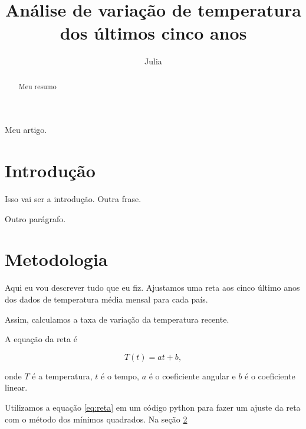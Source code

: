 \documentclass{article}
\begin{document}
\title{Análise de variação de temperatura dos últimos cinco anos}
\author{Julia}

\maketitle 

\begin{abstract}
Meu resumo 
\end{abstract}
	Meu artigo. 
	
\section{Introdução}
Isso vai ser a introdução.
Outra frase.

Outro parágrafo. 	

\section{Metodologia}
\label{sec:metodos}

Aqui eu vou descrever tudo que eu fiz. Ajustamos uma reta aos cinco último anos dos dados 
de temperatura média mensal para cada país. 

Assim, calculamos a taxa de variação da temperatura recente. 


A equação da reta é 

\begin{equation}
T(t) = a t + b, 
\label{eq:reta}
\end{equation}

\noindent
onde $T$ é a temperatura, $t$ é o tempo, $a$ é o coeficiente angular e $b$ é o coeficiente linear. 

Utilizamos a equação \ref{eq:reta} em um código python para fazer um ajuste da reta com o método dos mínimos quadrados. Na seção \ref{sec:metodos}
\end{document}
